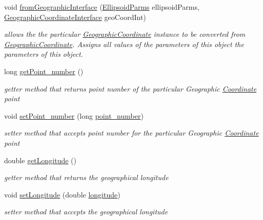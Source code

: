 \begin{DoxyCompactItemize}
void \hyperlink{classcoordinates_1_1_geographic_coordinate_ab5be730c1eee8c9a267f8fcd8fabaf69}{from\+Geographic\+Interface} (\hyperlink{classparams_1_1_ellipsoid_parms}{Ellipsoid\+Parms} ellipsoid\+Parms, \hyperlink{classcoordinates_1_1_geographic_coordinate_interface}{Geographic\+Coordinate\+Interface} geo\+Coord\+Int)
\begin{DoxyCompactList}\small\item\em allows the the particular \hyperlink{classcoordinates_1_1_geographic_coordinate}{Geographic\+Coordinate} instance to be converted from \hyperlink{classcoordinates_1_1_geographic_coordinate}{Geographic\+Coordinate}. Assigns all values of the parameters of this object the parameters of this object. \end{DoxyCompactList}\item 
long \hyperlink{classcoordinates_1_1_geographic_coordinate_a68208a97e0db4620dce1163bafdcab06}{get\+Point\+\_\+number} ()
\begin{DoxyCompactList}\small\item\em getter method that returns point number of the particular Geographic \hyperlink{classcoordinates_1_1_coordinate}{Coordinate} point \end{DoxyCompactList}\item 
void \hyperlink{classcoordinates_1_1_geographic_coordinate_a60674b3195f4470485e62005e90eb141}{set\+Point\+\_\+number} (long \hyperlink{classcoordinates_1_1_geographic_coordinate_a7d7384b678b1b189a8a023653f9d3c19}{point\+\_\+number})
\begin{DoxyCompactList}\small\item\em setter method that accepts point number for the particular Geographic \hyperlink{classcoordinates_1_1_coordinate}{Coordinate} point \end{DoxyCompactList}\item 
double \hyperlink{classcoordinates_1_1_geographic_coordinate_a1f6aea00058a08a23191930436cb5ef7}{get\+Longitude} ()
\begin{DoxyCompactList}\small\item\em getter method that returns the geographical longitude \end{DoxyCompactList}\item 
void \hyperlink{classcoordinates_1_1_geographic_coordinate_a72cfb2c3bcafcee1eff0da6b8e9da8fb}{set\+Longitude} (double \hyperlink{classcoordinates_1_1_geographic_coordinate_a1ffbbfc5c01ab766af1d32bcc8cb42ad}{longitude})
\begin{DoxyCompactList}\small\item\em setter method that accepts the geographical longitude \end{DoxyCompactList}\item 

\end{DoxyCompactItemize}
